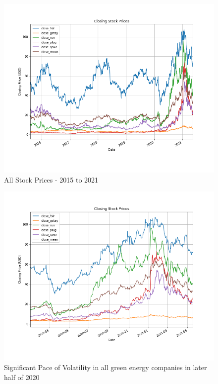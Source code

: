 \documentclass[sigconf, nonacm]{acmart}
\begin{document}
\begin{figure}[H]
  \centering
  \includegraphics[width=\linewidth]{all_stock_prices_and_mean/all_stock_prices_2015_2021.png}
  \caption{All Stock Prices - 2015 to 2021}
  \label{all_stock_prices_2015_2021}
\end{figure}

\begin{figure}[H]
  \centering
  \includegraphics[width=\linewidth]{all_stock_prices_and_mean/all_stock_prices_2020_2021.png}
  \caption{Significant Pace of Volatility in all green energy companies in later half of 2020}
  \label{all_stock_prices_2020_2021}
\end{figure}
\end{document}
